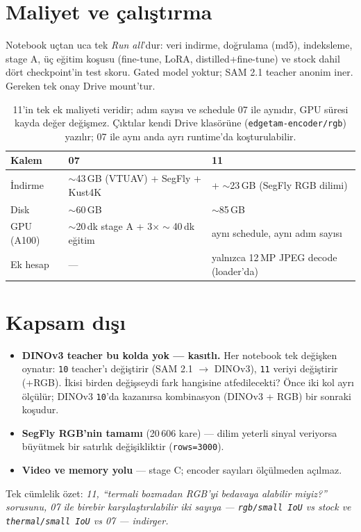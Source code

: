 \documentclass[11pt, paper=a4, DIV=14, parskip=half, numbers=noenddot]{scrartcl}
\newcommand{\code}[1]{\texttt{\small #1}}
\begin{document}
\section{Maliyet ve çalıştırma}

Notebook uçtan uca tek \emph{Run all}'dur: veri indirme, doğrulama
(md5), indeksleme, stage A, üç eğitim koşusu (fine-tune, LoRA,
distilled+fine-tune) ve stock dahil dört checkpoint'in test skoru. Gated
model yoktur; SAM 2.1 teacher anonim iner. Gereken tek onay Drive mount'tur.

\begin{table}[H]
\centering\small
\begin{tabular}{@{}lll@{}}
\toprule
Kalem & 07 & 11 \\
\midrule
İndirme & $\sim$43\,GB (VTUAV) + SegFly + Kust4K & + $\sim$23\,GB (SegFly RGB dilimi) \\
Disk & $\sim$60\,GB & $\sim$85\,GB \\
GPU (A100) & $\sim$20\,dk stage A + 3$\times\sim$40\,dk eğitim & aynı schedule, aynı adım sayısı \\
Ek hesap & --- & yalnızca 12\,MP JPEG decode (loader'da) \\
\bottomrule
\end{tabular}
\caption{11'in tek ek maliyeti veridir; adım sayısı ve schedule 07 ile
aynıdır, GPU süresi kayda değer değişmez. Çıktılar kendi Drive klasörüne
(\code{edgetam-encoder/rgb}) yazılır; 07 ile aynı anda ayrı runtime'da
koşturulabilir.}
\end{table}

\section{Kapsam dışı}
\label{sec:kapsam}

\begin{itemize}\itemsep2pt
  \item \textbf{DINOv3 teacher bu kolda yok --- kasıtlı.} Her notebook tek
        değişken oynatır: \code{10} teacher'ı değiştirir (SAM 2.1
        $\rightarrow$ DINOv3), \code{11} veriyi değiştirir (+RGB). İkisi
        birden değişseydi fark hangisine atfedilecekti? Önce iki kol ayrı
        ölçülür; DINOv3 \code{10}'da kazanırsa kombinasyon (DINOv3 + RGB)
        bir sonraki koşudur.
  \item \textbf{SegFly RGB'nin tamamı} (20\,606 kare) --- dilim yeterli
        sinyal veriyorsa büyütmek bir satırlık değişikliktir
        (\code{rows=3000}).
  \item \textbf{Video ve memory yolu} --- stage C; encoder sayıları
        ölçülmeden açılmaz.
\end{itemize}

\vspace{0.5em}
\noindent\textcolor{grimetin}{\small Tek cümlelik özet: \emph{11, ``termali
bozmadan RGB'yi bedavaya alabilir miyiz?'' sorusunu, 07 ile birebir
karşılaştırılabilir iki sayıya --- \code{rgb/small IoU} vs stock ve
\code{thermal/small IoU} vs 07 --- indirger.}}
\end{document}
